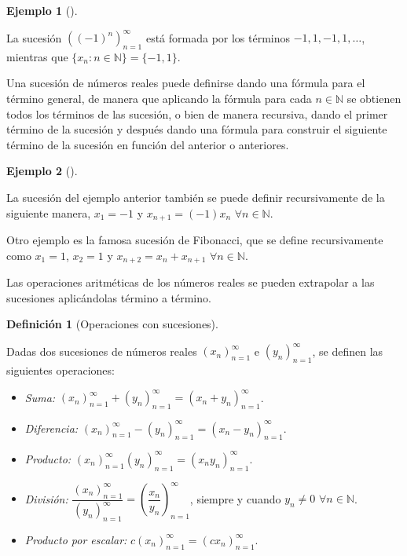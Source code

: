 \documentclass[
  a4paper,
]{scrreport}
\theoremstyle{definition}
\newtheorem{example}{Ejemplo}[chapter]
\theoremstyle{plain}
\theoremstyle{definition}
\newtheorem{definition}{Definición}[chapter]
\theoremstyle{plain}
\theoremstyle{plain}
\theoremstyle{remark}
\begin{document}
\leavevmode{}%
\begin{example}[]\label{exm-sucesion2}

La sucesión \(\left((-1)^n\right)_{n=1}^\infty\) está formada por los
términos \(-1,1,-1,1,\ldots\), mientras que
\(\{x_n:n\in\mathbb{N}\}=\{-1,1\}\).

\end{example}

Una sucesión de números reales puede definirse dando una fórmula para el
término general, de manera que aplicando la fórmula para cada
\(n\in\mathbb{N}\) se obtienen todos los términos de las sucesión, o
bien de manera recursiva, dando el primer término de la sucesión y
después dando una fórmula para construir el siguiente término de la
sucesión en función del anterior o anteriores.

\leavevmode{}%
\begin{example}[]\label{exm-sucesion2}

La sucesión del ejemplo anterior también se puede definir recursivamente
de la siguiente manera, \(x_1=-1\) y \(x_{n+1}=(-1)x_n\)
\(\forall n\in\mathbb{N}\).

Otro ejemplo es la famosa sucesión de Fibonacci, que se define
recursivamente como \(x_1=1\), \(x_2=1\) y \(x_{n+2}=x_{n}+x_{n+1}\)
\(\forall n\in\mathbb{N}\).

\end{example}

Las operaciones aritméticas de los números reales se pueden extrapolar a
las sucesiones aplicándolas término a término.

\leavevmode{}%
\begin{definition}[Operaciones con
sucesiones]\label{def-operaciones-sucesiones}

Dadas dos sucesiones de números reales \((x_n)_{n=1}^\infty\) e
\((y_n)_{n=1}^\infty\), se definen las siguientes operaciones:

\begin{itemize}
\item
  \emph{Suma:}
  \((x_n)_{n=1}^\infty + (y_n)_{n=1}^\infty = (x_n+y_n)_{n=1}^\infty\).
\item
  \emph{Diferencia:}
  \((x_n)_{n=1}^\infty - (y_n)_{n=1}^\infty = (x_n-y_n)_{n=1}^\infty\).
\item
  \emph{Producto:}
  \((x_n)_{n=1}^\infty (y_n)_{n=1}^\infty = (x_ny_n)_{n=1}^\infty\).
\item
  \emph{División:}
  \(\dfrac{(x_n)_{n=1}^\infty}{(y_n)_{n=1}^\infty} = \left(\dfrac{x_n}{y_n}\right)_{n=1}^\infty\),
  siempre y cuando \(y_n\neq 0\) \(\forall n\in\mathbb{N}\).
\item
  \emph{Producto por escalar:}
  \(c(x_n)_{n=1}^\infty = (cx_n)_{n=1}^\infty\).
\end{itemize}

\end{definition}
\end{document}
